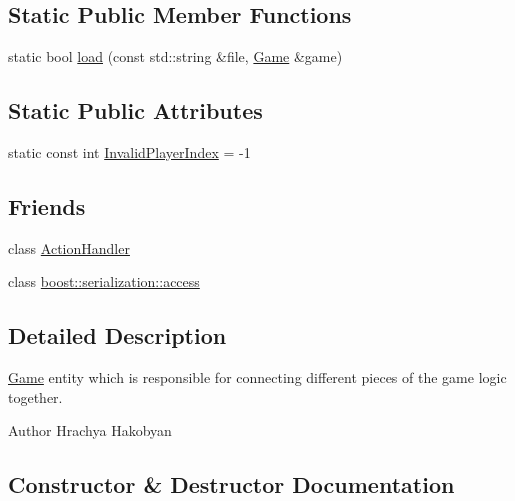 \subsection*{Static Public Member Functions}
\begin{DoxyCompactItemize}
\item 
static bool \hyperlink{classpan_1_1_game_a3e462af43777e6159bd7ff4c3ca0815c}{load} (const std\+::string \&file, \hyperlink{classpan_1_1_game}{Game} \&game)
\end{DoxyCompactItemize}
\subsection*{Static Public Attributes}
\begin{DoxyCompactItemize}
\item 
static const int \hyperlink{classpan_1_1_game_ade098455080cd39281e873a499331139}{Invalid\+Player\+Index} = -\/1
\end{DoxyCompactItemize}
\subsection*{Friends}
\begin{DoxyCompactItemize}
\item 
class \hyperlink{classpan_1_1_game_a97e74bf016dcec05afd5626a1f2df25a}{Action\+Handler}
\item 
class \hyperlink{classpan_1_1_game_ac98d07dd8f7b70e16ccb9a01abf56b9c}{boost\+::serialization\+::access}
\end{DoxyCompactItemize}


\subsection{Detailed Description}
\hyperlink{classpan_1_1_game}{Game} entity which is responsible for connecting different pieces of the game logic together. 

\begin{DoxyAuthor}{Author}
Hrachya Hakobyan 
\end{DoxyAuthor}


\subsection{Constructor \& Destructor Documentation}
\mbox{\label{classpan_1_1_game_a2c186c7ecac0fded27c7a9db4981a733}} 

